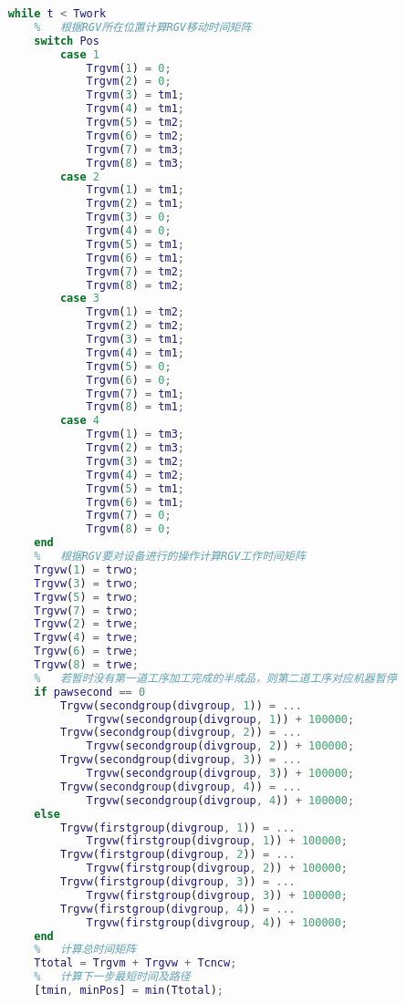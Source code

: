 \documentclass[no-math,withoutpreface,bwprint]{cumcmthesis} %
\numberwithin{equation}{section}
\numberwithin{figure}{section}
\numberwithin{table}{section}
\begin{document}
\begin{lstlisting}[language=matlab]
    %   总时间不超过8小时
    while t < Twork
        %   根据RGV所在位置计算RGV移动时间矩阵
        switch Pos
            case 1
                Trgvm(1) = 0;
                Trgvm(2) = 0;
                Trgvm(3) = tm1;
                Trgvm(4) = tm1;
                Trgvm(5) = tm2;
                Trgvm(6) = tm2;
                Trgvm(7) = tm3;
                Trgvm(8) = tm3;
            case 2
                Trgvm(1) = tm1;
                Trgvm(2) = tm1;
                Trgvm(3) = 0;
                Trgvm(4) = 0;
                Trgvm(5) = tm1;
                Trgvm(6) = tm1;
                Trgvm(7) = tm2;
                Trgvm(8) = tm2;               
            case 3
                Trgvm(1) = tm2;
                Trgvm(2) = tm2;
                Trgvm(3) = tm1;
                Trgvm(4) = tm1;
                Trgvm(5) = 0;
                Trgvm(6) = 0;
                Trgvm(7) = tm1;
                Trgvm(8) = tm1;
            case 4
                Trgvm(1) = tm3;
                Trgvm(2) = tm3;
                Trgvm(3) = tm2;
                Trgvm(4) = tm2;
                Trgvm(5) = tm1;
                Trgvm(6) = tm1;
                Trgvm(7) = 0;
                Trgvm(8) = 0;        
        end
        %   根据RGV要对设备进行的操作计算RGV工作时间矩阵
        Trgvw(1) = trwo;
        Trgvw(3) = trwo;
        Trgvw(5) = trwo;
        Trgvw(7) = trwo;
        Trgvw(2) = trwe;
        Trgvw(4) = trwe;
        Trgvw(6) = trwe;
        Trgvw(8) = trwe;
        %   若暂时没有第一道工序加工完成的半成品，则第二道工序对应机器暂停
        if pawsecond == 0
            Trgvw(secondgroup(divgroup, 1)) = ...
                Trgvw(secondgroup(divgroup, 1)) + 100000;
            Trgvw(secondgroup(divgroup, 2)) = ...
                Trgvw(secondgroup(divgroup, 2)) + 100000;
            Trgvw(secondgroup(divgroup, 3)) = ...
                Trgvw(secondgroup(divgroup, 3)) + 100000;
            Trgvw(secondgroup(divgroup, 4)) = ...
                Trgvw(secondgroup(divgroup, 4)) + 100000;
        else
            Trgvw(firstgroup(divgroup, 1)) = ...
                Trgvw(firstgroup(divgroup, 1)) + 100000;
            Trgvw(firstgroup(divgroup, 2)) = ...
                Trgvw(firstgroup(divgroup, 2)) + 100000;
            Trgvw(firstgroup(divgroup, 3)) = ...
                Trgvw(firstgroup(divgroup, 3)) + 100000;
            Trgvw(firstgroup(divgroup, 4)) = ...
                Trgvw(firstgroup(divgroup, 4)) + 100000;
        end
        %   计算总时间矩阵
        Ttotal = Trgvm + Trgvw + Tcncw;
        %   计算下一步最短时间及路径
        [tmin, minPos] = min(Ttotal);

\end{lstlisting}
\end{document}
